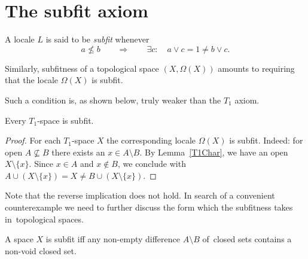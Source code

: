 \section{The subfit axiom}

\begin{df}[Sfit]
  A locale $L$ is said to be {\sl subfit\/} whenever
  \[
    a \not\le b \qquad \Rightarrow \qquad \exists c: \quad a \vee c = 1 \ne b
    \vee c.
  \]
\end{df}

Similarly, subfitness of a topological space $(X, \Omega(X))$ amounts to
requiring that the locale $\Omega(X)$ is subfit.

Such a condition is, as shown below, truly weaker than the $T_1$ axiom.

\begin{prop}
  Every $T_1$-space is subfit.
\end{prop}

\begin{proof}
  For each $T_1$-space $X$ the corresponding locale $\Omega(X)$ is subfit.
  Indeed: for open $A\not\subseteq B$ there exists an $x\in A \setminus B$.
  By Lemma~\ref{T1Char}\thinspace, we have an open $X\setminus \{x\}$.
  Since $x\in A$ and $x\not\in B$, we conclude with $A\cup (X\setminus \{x\}) =
  X \ne B \cup (X\setminus \{x\})$.
\end{proof}

Note that the reverse implication does not hold.
In search of a convenient counterexample we need to further discuss the form
which the subfitness takes in~topological spaces.

\begin{prop}
  A space $X$ is subfit iff any non-empty difference $A\setminus B$ of~closed
  sets contains a non-void closed set.
\end{prop}

